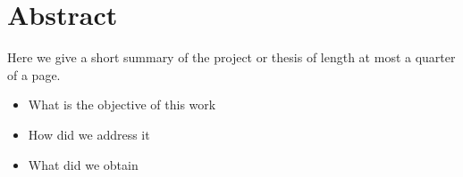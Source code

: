 
\section*{Abstract}
Here we give a short summary of the project or thesis of length at most a quarter of a page.

\begin{itemize}
  \item What is the objective of this work
  \item How did we address it
  \item What did we obtain
\end{itemize}



